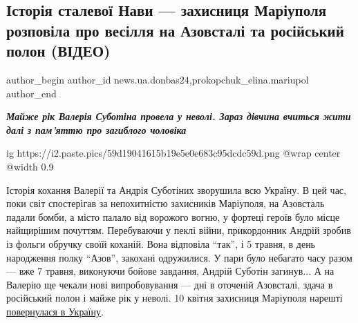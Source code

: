  
 
 
 
 
 
\subsection{Історія сталевої Нави — захисниця Маріуполя розповіла про весілля на Азовсталі та російський полон (ВІДЕО)}
\label{sec:05_05_2023.stz.news.ua.donbas24.1.istoria_stalevoj_navy}
 
\ifcmt
 author_begin
   author_id news.ua.donbas24,prokopchuk_elina.mariupol
 author_end
\fi

\begin{center}
\em\color{blue}\Large\bfseries
Майже рік Валерія Суботіна провела у неволі. Зараз дівчина вчиться жити далі з
пам'яттю про загиблого чоловіка	
\end{center}

\ifcmt
  ig https://i2.paste.pics/59d19041615b19e5e0e683c95dcdc59d.png
  @wrap center
  @width 0.9
\fi

Історія кохання Валерії та Андрія Суботіних зворушила всю Україну. В цей час,
поки світ спостерігав за непохитністю захисників Маріуполя, на Азовсталь падали
бомби, а місто палало від ворожого вогню, у фортеці героїв було місце
найщирішим почуттям. Перебуваючи у пеклі війни, прикордонник Андрій зробив із
фольги обручку своїй коханій. Вона відповіла \enquote{так}, і 5 травня, в день
народження полку \enquote{Азов}, закохані одружилися. У пари було небагато часу разом —
вже 7 травня, виконуючи бойове завдання, Андрій Суботін загинув... А на Валерію
ще чекали нові випробовування — дні в оточеній Азовсталі, здача в російський
полон і майже рік у неволі. 10 квітня захисниця Маріуполя нарешті \href{https://donbas24.news/news/nava-povernulasya-z-polonu-zvilnili-zaxisnicyu-mariupolya-valeriyu-subotinu}{повернулася в Україну}.


